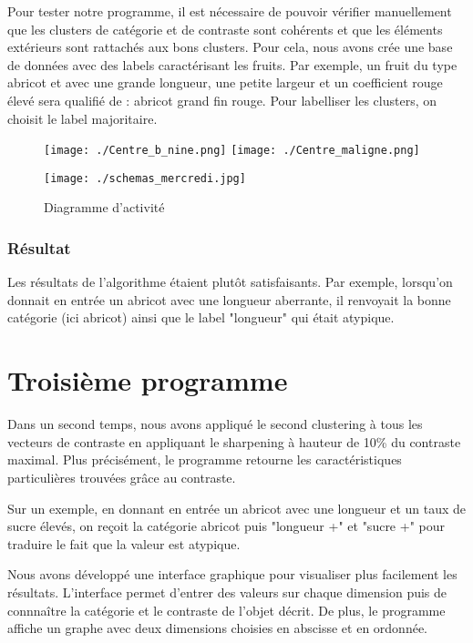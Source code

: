 \documentclass[a4paper,10pt]{article}
\begin{document}
Pour tester notre programme, il est nécessaire de pouvoir vérifier manuellement que les clusters de catégorie et de contraste sont cohérents et que les éléments extérieurs sont rattachés aux bons clusters. Pour cela, nous avons crée une base de données avec des labels caractérisant les fruits. Par exemple, un fruit du type abricot et avec une grande longueur, une petite largeur et un coefficient rouge élevé sera qualifié de : abricot grand fin rouge. Pour labelliser les clusters, on choisit le label majoritaire.

\begin{figure}[h]
    \texttt{[image: ./Centre\_b\_nine.png]}
    \texttt{[image: ./Centre\_maligne.png]}
\end{figure}

\begin{figure}[h]
 \begin{center}
  \texttt{[image: ./schemas\_mercredi.jpg]}
 \end{center}
 \caption{Diagramme d'activité}
\end{figure}

\subsubsection*{Résultat}

Les résultats de l'algorithme étaient plutôt satisfaisants. Par exemple, lorsqu'on donnait en entrée un abricot avec une longueur aberrante, il renvoyait la bonne catégorie (ici abricot) ainsi que le label "longueur" qui était atypique. 

\newpage

\section{Troisième programme}

Dans un second temps, nous avons appliqué le second clustering à tous les vecteurs de contraste en appliquant le sharpening à hauteur de 10\% du contraste maximal. Plus précisément, le programme retourne les caractéristiques particulières trouvées grâce au contraste.

Sur un exemple, en donnant en entrée un abricot avec une longueur et un taux de sucre élevés, on reçoit la catégorie abricot puis "longueur +" et "sucre +" pour traduire le fait que la valeur est atypique.


Nous avons développé une interface graphique pour visualiser plus facilement les résultats. L'interface permet d'entrer des valeurs sur chaque dimension puis de connnaître la catégorie et le contraste de l'objet décrit. De plus, le programme affiche un graphe avec deux dimensions choisies en abscisse et en ordonnée. 
\end{document}
